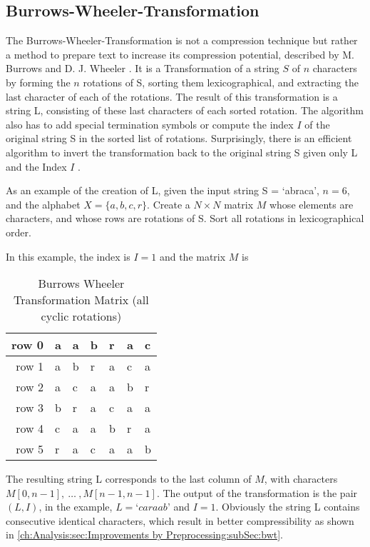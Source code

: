 \subsection{Burrows-Wheeler-Transformation}
\label{ch:Principles of compression:sec:Other:subSec:bwt}

\par{
The Burrows-Wheeler-Transformation is not a compression technique but rather a method to prepare text to increase its compression potential, described by M. Burrows and D. J. Wheeler \cite{Burrows94}. It is a Transformation of a string $S$ of $n$ characters by forming the $n$
rotations of S, sorting them lexicographical, and extracting the last
character of each of the rotations. The result of this transformation is a string L, consisting of these last characters of each sorted rotation. The algorithm also has to add special termination symbols or compute the index $I$ of the original string S in the sorted list of
rotations. Surprisingly, there is an efficient algorithm to invert the transformation back to the original string S given only L and the Index $I$ \cite{Burrows-linear-time}.
}

\par {
As an example of the creation of L, given the input string S = ‘abraca’, $n = 6$, and the alphabet
$X = \{a,b,c,r\}$. Create a $N \times N$ matrix $M$ whose elements are characters, and
whose rows are rotations of S. Sort all rotations in lexicographical order.
}

\par{
In this example, the index is $I = 1$ and the matrix $M$ is

\begin{table}[h]
	\centering
	\begin{tabular}{r|l|l|l|l|l|l}
		row 0 & a & a & b & r & a & c\\
		\hline
		row 1 & a & b & r & a & c & a\\
		\hline
		row 2 & a & c & a & a & b & r\\
		\hline
		row 3 & b & r & a & c & a & a\\
		\hline
		row 4 & c & a & a & b & r & a\\
		\hline
		row 5 & r & a & c & a & a & b
		\label{tab:t10 bwt-example}
	\end{tabular}
	\caption{Burrows Wheeler Transformation Matrix (all cyclic rotations)}
\end{table}


The resulting string L corresponds to the last column of $M$, with characters $M[0,n -1],\: \dots \: ,M[n - 1, n - 1]$. The output of the transformation is the pair $(L, I)$, in the example, $L = ‘caraab’$ and $I = 1$. Obviously the string L contains consecutive identical characters, which result in better compressibility as shown in \ref{ch:Analysis:sec:Improvements by Preprocessing:subSec:bwt}.
}

